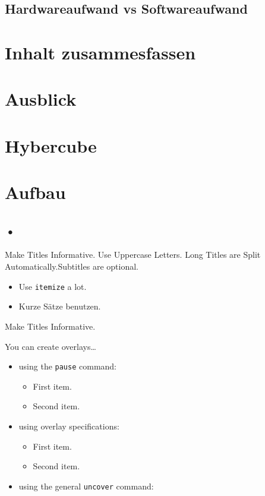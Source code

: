 \documentclass[ucs,9pt]{beamer}
\begin{document}
\subsection{Hardwareaufwand vs Softwareaufwand}


\section{Inhalt zusammesfassen}

\section{Ausblick}
\section{Hybercube}
\section{Aufbau}
\subsection{•}



\begin{frame}{Make Titles Informative. Use Uppercase Letters. Long Titles are Split Automatically.}{Subtitles are optional.}
  \begin{itemize}
  \item
    Use \texttt{itemize} a lot.
  \item
   	Kurze Sätze benutzen.
  \end{itemize}
\end{frame}

\begin{frame}{Make Titles Informative.}

  You can create overlays\dots
  \begin{itemize}
  \item using the \texttt{pause} command:
    \begin{itemize}
    \item
      First item.
      \pause
    \item    
      Second item.
    \end{itemize}
  \item
    using overlay specifications:
    \begin{itemize}
    \item<3->
      First item.
    \item<4->
      Second item.
    \end{itemize}
  \item
    using the general \texttt{uncover} command:
    \begin{itemize}
    \end{itemize}
  \end{itemize}
\end{frame}
\end{document}
